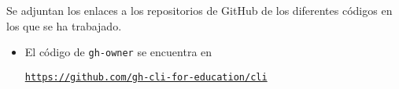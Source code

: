Se adjuntan los enlaces a los repositorios de GitHub de los diferentes códigos en los que se ha trabajado.

\begin{itemize}
  \item El código de \verb|gh-owner| se encuentra en

  \href{https://github.com/gh-cli-for-education/cli}{{\tt https://github.com/gh-cli-for-education/cli}}

  
\end{itemize}